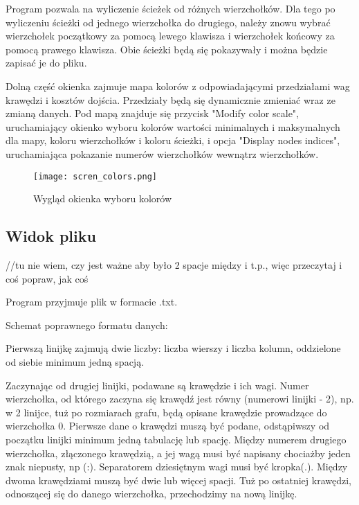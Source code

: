 \documentclass[]{article}
\begin{document}
Program pozwala na wyliczenie ścieżek od różnych wierzchołków. Dla tego po wyliczeniu ścieżki od jednego wierzchołka do drugiego, należy znowu wybrać wierzchołek początkowy za pomocą lewego klawisza i wierzchołek końcowy za pomocą prawego klawisza. Obie ścieżki będą się pokazywały i można będzie zapisać je do pliku.

Dolną część okienka zajmuje mapa kolorów z odpowiadającymi przedziałami wag krawędzi i kosztów dojścia. Przedziały będą się dynamicznie zmieniać wraz ze zmianą danych.
Pod mapą znajduje się przycisk "Modify color scale", uruchamiający okienko wyboru kolorów wartości minimalnych i maksymalnych dla mapy, koloru wierzchołków i koloru ścieżki, i opcja "Display nodes indices", uruchamiająca pokazanie numerów wierzchołków wewnątrz wierzchołków. 

\begin{figure}[H]
\begin{center}
  \texttt{[image: scren\_colors.png]}
  \end{center}
  \caption{Wygląd okienka wyboru kolorów}
  \label{fig:graf}
\end{figure}

\subsection{Widok pliku}

//tu nie wiem, czy jest ważne aby było 2 spacje między i t.p., więc przeczytaj i coś popraw, jak coś

Program przyjmuje plik w formacie .txt.

Schemat poprawnego formatu danych:

Pierwszą linijkę zajmują dwie liczby: liczba wierszy i liczba kolumn, oddzielone od siebie minimum jedną spacją.

Zaczynając od drugiej linijki, podawane są krawędzie i ich wagi. Numer wierzchołka, od którego zaczyna się krawędź jest równy (numerowi linijki - 2), np. w 2 linijce, tuż po rozmiarach grafu, będą opisane krawędzie prowadzące do wierzchołka 0. Pierwsze dane o krawędzi muszą być podane, odstąpiwszy od początku linijki minimum jedną tabulację lub spację. Między numerem drugiego wierzchołka, złączonego krawędzią, a jej wagą musi być napisany chociażby jeden znak niepusty, np (:). Separatorem dziesiętnym wagi musi być kropka(.). Między dwoma krawędziami muszą być dwie lub więcej spacji. Tuż po ostatniej krawędzi, odnoszącej się do danego wierzchołka, przechodzimy na nową linijkę.
\end{document}
